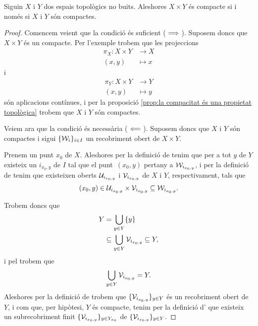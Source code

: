 \documentclass[../Apunts.tex]{subfiles}
\begin{document}
	\begin{theorem}
		\label{thm:Teorema de Tychonoff}
		Siguin \(X\) i \(Y\) dos espais topològics no buits. Aleshores \(X\times Y\) és compacte si i només si \(X\) i \(Y\) són compactes.
		\begin{proof}
			Comencem veient que la condició és suficient (\(\implies\)). Suposem doncs que \(X\times Y\) és un compacte. Per l'exemple  trobem que les projeccions
			\begin{align*}
				\pi_{X}\colon X\times Y&\longrightarrow X \\
				(x,y)&\longmapsto x
			\end{align*}
			i
			\begin{align*}
				\pi_{Y}\colon X\times Y&\longrightarrow Y \\
				(x,y)&\longmapsto y
			\end{align*}
			són aplicacions contínues, i per la proposició \ref{prop:la compacitat és una propietat topològica} trobem que \(X\) i \(Y\) són compactes.
			
			Veiem ara que la condició és necessària (\(\impliedby\)). Suposem doncs que \(X\) i \(Y\) són compactes i sigui \(\{\mathcal{W}_{i}\}_{i\in I}\) un recobriment obert de \(X\times Y\).
			
			Prenem un punt \(x_{0}\) de \(X\). Aleshores per la definició de  tenim que per a tot \(y\) de \(Y\) existeix un \(i_{x_{0},y}\) de \(I\) tal que el punt~\((x_{0},y)\) pertany a \(\mathcal{W}_{i_{x_{0},y}}\), i per la definició de  tenim que existeixen oberts \(\mathcal{U}_{i_{x_{0},y}}\) i \(\mathcal{V}_{i_{x_{0},y}}\) de \(X\) i \(Y\), respectivament, tals que
			\[(x_{0},y)\in\mathcal{U}_{i_{x_{0},y}}\times\mathcal{V}_{i_{x_{0},y}}\subseteq\mathcal{W}_{i_{x_{0},y}}.\]
			
			Trobem doncs que
			\begin{align*}
				Y&=\bigcup_{y\in Y}\{y\} \\
				&\subseteq\bigcup_{y\in Y}\mathcal{V}_{i_{x_{0},y}}\subseteq Y,
			\end{align*}
			i pel  trobem que
			\[\bigcup_{y\in Y}\mathcal{V}_{i_{x_{0},y}}=Y.\]
			Aleshores per la definició de  trobem que \(\{\mathcal{V}_{i_{x_{0},y}}\}_{y\in Y}\) és un recobriment obert de \(Y\), i com que, per hipòtesi, \(Y\) és compacte, tenim per la definició d' que existeix un subrecobriment finit \(\{\mathcal{V}_{i_{x_{0},y}}\}_{y\in Y_{x_{0}}}\) de \(\{\mathcal{V}_{i_{x_{0},y}}\}_{y\in Y}\).
			

\end{proof}
\end{theorem}
\end{document}
